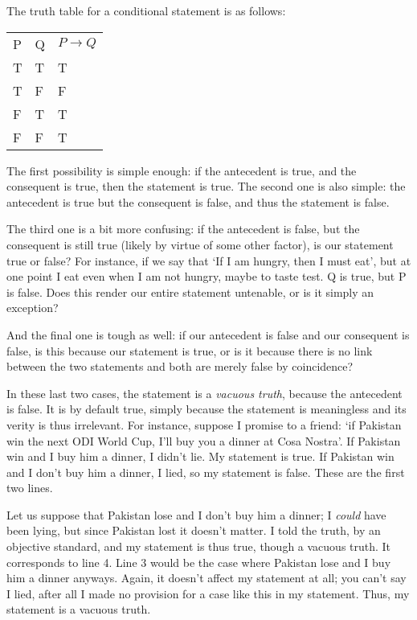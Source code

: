\documentclass[a4paper, 11pt]{article}
\begin{document}
The truth table for a conditional statement is as follows:

\begin{table}[htbp]
  \centering
  \begin{tabular}{lll}
    P & Q & $P \rightarrow Q$ \\
    T & T & T                 \\
    T & F & F                 \\
    F & T & T                 \\
    F & F & T                 \\
  \end{tabular}
\end{table}
The first possibility is simple enough: if the antecedent is true, and the consequent is true, then the statement is true. The second one is also simple: the antecedent is true but the consequent is false, and thus the statement is false.

The third one is a bit more confusing: if the antecedent is false, but the consequent is still true (likely by virtue of some other factor), is our statement true or false? For instance, if we say that `If I am hungry, then I must eat', but at one point I eat even when I am not hungry, maybe to taste test. Q is true, but P is false. Does this render our entire statement untenable, or is it simply an exception?

And the final one is tough as well: if our antecedent is false and our consequent is false, is this because our statement is true, or is it because there is no link between the two statements and both are merely false by coincidence?

In these last two cases, the statement is a \textit{vacuous truth}, because the antecedent is false. It is by default true, simply because the statement is meaningless and its verity is thus irrelevant. For instance, suppose I promise to a friend: `if Pakistan win the next ODI World Cup, I'll buy you a dinner at Cosa Nostra'. If Pakistan win and I buy him a dinner, I didn't lie. My statement is true. If Pakistan win and I don't buy him a dinner, I lied, so my statement is false. These are the first two lines.

Let us suppose that Pakistan lose and I don't buy him a dinner; I \textit{could} have been lying, but since Pakistan lost it doesn't matter. I told the truth, by an objective standard, and my statement is thus true, though a vacuous truth. It corresponds to line 4. Line 3 would be the case where Pakistan lose and I buy him a dinner anyways. Again, it doesn't affect my statement at all; you can't say I lied, after all I made no provision for a case like this in my statement. Thus, my statement is a vacuous truth.
\end{document}
